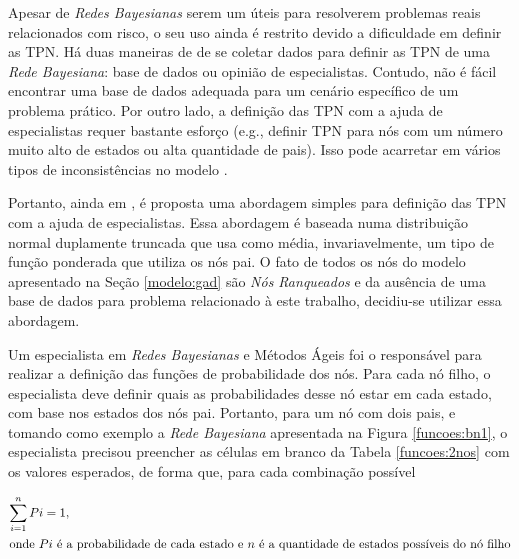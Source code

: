 Apesar de \textit{Redes Bayesianas} serem um úteis para resolverem problemas reais relacionados com risco, o seu uso ainda é restrito devido a dificuldade em definir as TPN. Há duas maneiras de
de se coletar dados para definir as TPN de uma \textit{Rede Bayesiana}: base de dados ou opinião de especialistas. Contudo, não é fácil encontrar uma base de dados adequada para um cenário específico de um problema prático. Por outro lado, a definição das TPN com a ajuda de especialistas requer bastante esforço (e.g., definir TPN para nós com um número muito alto de estados ou alta quantidade de pais). Isso pode acarretar em vários tipos de inconsistências no modelo \cite{fenton}.

Portanto, ainda em \cite{fenton}, é proposta uma abordagem simples para definição das TPN com a ajuda de especialistas. Essa abordagem é baseada numa distribuição normal duplamente truncada que usa como média, invariavelmente, um tipo de função ponderada que utiliza os nós pai. O fato de todos os nós do modelo apresentado na Seção \ref{modelo:gad} são \textit{Nós Ranqueados} e da ausência de uma base de dados para problema relacionado à este trabalho, decidiu-se utilizar essa abordagem.

Um especialista em \textit{Redes Bayesianas} e Métodos Ágeis foi o responsável para realizar a definição das funções de probabilidade dos nós. Para cada nó filho, o especialista deve definir quais as probabilidades desse nó estar em cada estado, com base nos estados dos nós pai. Portanto, para um nó com dois pais, e tomando como exemplo a \textit{Rede Bayesiana} apresentada na Figura \ref{funcoes:bn1}, o especialista precisou preencher as células em branco da Tabela \ref{funcoes:2nos} com os valores esperados, de forma que, para cada combinação possível

\begin{align}
  \sum_{i=1}^{n}Pi = 1,\\
  \intertext{onde $Pi$ é a probabilidade de cada estado e $n$ é a quantidade de estados \linebreak possíveis do nó filho}
\end{align}

